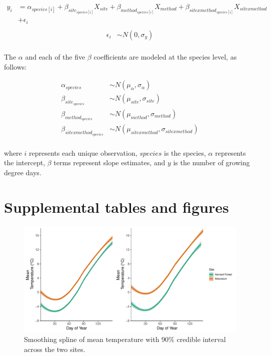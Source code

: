 \documentclass{article}\usepackage[]{graphicx}\usepackage[]{color}
\begin{document}
\begin{align*}
y_i &= \alpha_{species[i]} + \beta_{site_{species[i]}}X_{site} + \beta_{method_{species[i]}}X_{method} + \beta_{sitexmethod_{species[i]}}X_{sitexmethod}\\
&+ \epsilon_i \tag{1}\\
\end{align*}
\begin{align*}
\epsilon_i & \sim N(0,\sigma_y) \\
\end{align*}

The $\alpha$ and each of the five $\beta$ coefficients are modeled at the species level, as follows:

\begin{align*}
\alpha_{species} & \sim N(\mu_{\alpha}, \sigma_{\alpha}) \\
\beta_{site_{species}} & \sim N(\mu_{site}, \sigma_{site}) \\
\beta_{method_{species}} & \sim N(\mu_{method}, \sigma_{method}) \\
\beta_{sitexmethod_{species}} & \sim N(\mu_{sitexmethod}, \sigma_{sitexmethod}) \\
\end{align*}

where $i$ represents each unique observation, $species$ is the species, $\alpha$ represents the intercept, $\beta$ terms represent slope estimates, and $y$ is the number of growing degree days. 




\section*{Supplemental tables and figures}

{\begin{figure} [H]
  \begin{center}
  \includegraphics[width=12cm]{..//analyses/figures/climate_hfandts.pdf}
  \caption{Smoothing spline of mean temperature with 90\% credible interval across the two sites.}\label{fig:clim}
  \end{center}
  \end{figure}}
\end{document}
